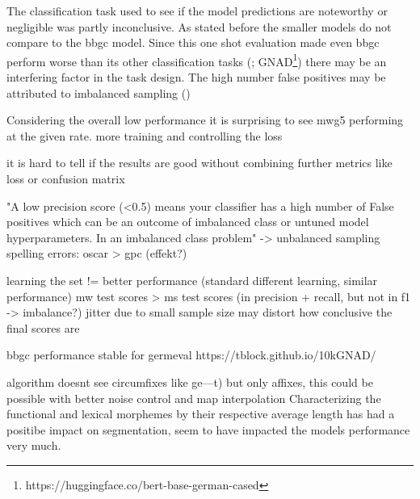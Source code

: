The classification task used to see if the model predictions are noteworthy or negligible was partly inconclusive.
As stated before the smaller models do not compare to the bbgc model.
Since this one shot evaluation made even bbgc perform worse than its other classification tasks (\textcite{germeval}; GNAD\footnote{https://huggingface.co/bert-base-german-cased}) there may be an interfering factor in the task design.
The high number false positives may be attributed to imbalanced sampling (\cite[5--6]{brownlee2020imbalanced})

Considering the overall low performance it is surprising to see mwg5 performing at the given rate.
more training and controlling the loss



it is hard to tell if the results are good without combining further metrics like loss or confusion matrix

"A low precision score (<0.5) means your classifier has a high number of False positives which can be an outcome of imbalanced class or untuned model hyperparameters. In an imbalanced class problem"
-> unbalanced sampling
spelling errors: oscar > gpc (effekt?)

learning the set != better performance (standard different learning, similar performance)
mw test scores > ms test scores (in precision + recall, but not in f1 -> imbalance?)
jitter due to small sample size may distort how conclusive the final scores are

bbgc performance stable for germeval \cite{germeval}
https://tblock.github.io/10kGNAD/

algorithm doesnt see circumfixes like ge---t) but only affixes, this could be possible with better noise control and map interpolation
Characterizing the functional and lexical morphemes by their respective average length has had a positibe impact on segmentation, seem to have impacted the models performance very much.





